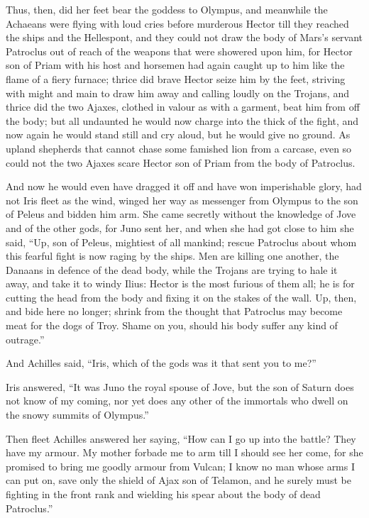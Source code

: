 Thus, then, did her feet bear the goddess to Olympus, and meanwhile the
Achaeans were flying with loud cries before murderous Hector till they
reached the ships and the Hellespont, and they could not draw the body of
Mars’s servant Patroclus out of reach of the weapons that were showered
upon him, for Hector son of Priam with his host and horsemen had again
caught up to him like the flame of a fiery furnace; thrice did brave
Hector seize him by the feet, striving with might and main to draw him
away and calling loudly on the Trojans, and thrice did the two Ajaxes,
clothed in valour as with a garment, beat him from off the body; but all
undaunted he would now charge into the thick of the fight, and now again
he would stand still and cry aloud, but he would give no ground. As upland
shepherds that cannot chase some famished lion from a carcase, even so
could not the two Ajaxes scare Hector son of Priam from the body of
Patroclus.

And now he would even have dragged it off and have won imperishable glory,
had not Iris fleet as the wind, winged her way as messenger from Olympus
to the son of Peleus and bidden him arm. She came secretly without the
knowledge of Jove and of the other gods, for Juno sent her, and when she
had got close to him she said, “Up, son of Peleus, mightiest of all
mankind; rescue Patroclus about whom this fearful fight is now raging by
the ships. Men are killing one another, the Danaans in defence of the dead
body, while the Trojans are trying to hale it away, and take it to windy
Ilius: Hector is the most furious of them all; he is for cutting the head
from the body and fixing it on the stakes of the wall. Up, then, and bide
here no longer; shrink from the thought that Patroclus may become meat for
the dogs of Troy. Shame on you, should his body suffer any kind of
outrage.”

And Achilles said, “Iris, which of the gods was it that sent you to me?”

Iris answered, “It was Juno the royal spouse of Jove, but the son of
Saturn does not know of my coming, nor yet does any other of the immortals
who dwell on the snowy summits of Olympus.”

Then fleet Achilles answered her saying, “How can I go up into the battle?
They have my armour. My mother forbade me to arm till I should see her
come, for she promised to bring me goodly armour from Vulcan; I know no
man whose arms I can put on, save only the shield of Ajax son of Telamon,
and he surely must be fighting in the front rank and wielding his spear
about the body of dead Patroclus.”

